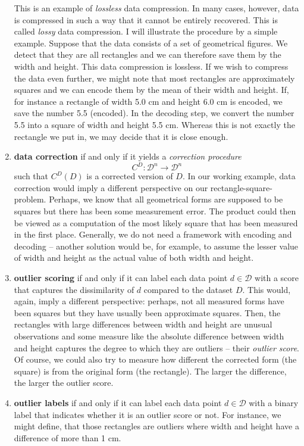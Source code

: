 \documentclass[]{report}
\theoremstyle{definition}
\theoremstyle{definition}
\theoremstyle{definition}
\theoremstyle{remark}
\begin{document}
\begin{enumerate}
  This is an example of \emph{lossless} data compression. In many cases,
  however, data is compressed in such a way that it cannot be entirely
  recovered. This is called \emph{lossy} data compression. I will
  illustrate the procedure by a simple example. Suppose that the data
  consists of a set of geometrical figures. We detect that they are all
  rectangles and we can therefore save them by the width and height.
  This data compression is lossless. If we wish to compress the data
  even further, we might note that most rectangles are approximately
  squares and we can encode them by the mean of their width and height.
  If, for instance a rectangle of width 5.0 cm and height 6.0 cm is
  encoded, we save the number 5.5 (encoded). In the decoding step, we
  convert the number 5.5 into a square of width and height 5.5 cm.
  Whereas this is not exactly the rectangle we put in, we may decide
  that it is close enough.
\item
  \textbf{data correction} if and only if it yields a \emph{correction
  procedure} \[C^D:\mathcal{D}^n\to\mathcal{D}^n\] such that \(C^D(D)\)
  is a corrected version of \(D\). In our working example, data
  correction would imply a different perspective on our
  rectangle-square-problem. Perhaps, we know that all geometrical forms
  are supposed to be squares but there has been some measurement error.
  The product could then be viewed as a computation of the most likely
  square that has been measured in the first place. Generally, we do not
  need a framework with encoding and decoding -- another solution would
  be, for example, to assume the lesser value of width and height as the
  actual value of both width and height.
\item
  \textbf{outlier scoring} if and only if it can label each data point
  \(d\in\mathcal{D}\) with a score that captures the dissimilarity of
  \(d\) compared to the dataset \(D\). This would, again, imply a
  different perspective: perhaps, not all measured forms have been
  squares but they have usually been approximate squares. Then, the
  rectangles with large differences between width and height are unusual
  observations and some measure like the absolute difference between
  width and height captures the degree to which they are outliers --
  their \emph{outlier score}. Of course, we could also try to measure
  how different the corrected form (the square) is from the original
  form (the rectangle). The larger the difference, the larger the
  outlier score.
\item
  \textbf{outlier labels} if and only if it can label each data point
  \(d\in\mathcal{D}\) with a binary label that indicates whether it is
  an outlier score or not. For instance, we might define, that those
  rectangles are outliers where width and height have a difference of
  more than 1 cm.
\end{enumerate}
\end{document}
